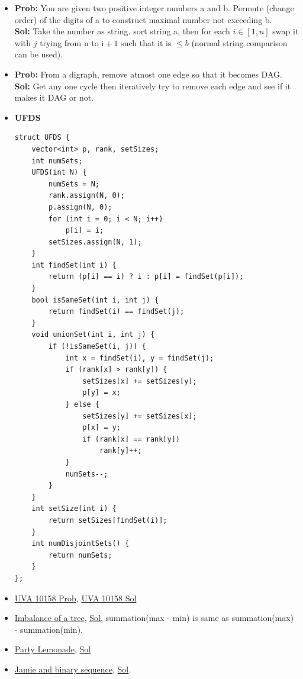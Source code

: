 \documentclass[8pt, a4paper, oneside, twocolumn]{extarticle}
\begin{document}
\begin{itemize}
    \item \textbf{Prob: }You are given two positive integer numbers a and b. Permute (change order) of the digits of a to construct maximal number not exceeding b.
    \\\textbf{Sol: }Take the number as string. sort string a, then for each $i \in [1, n]$ swap it with $j$ trying from $\text{n to i} + 1$ such that it is $\leq b$ (normal string comparison can be used).
    \item \textbf{Prob: }From a digraph, remove atmost one edge so that it becomes DAG.
    \\\textbf{Sol: }Get any one cycle then iteratively try to remove each edge and see if it makes it DAG or not.
    \item \textbf{UFDS}
    \begin{verbatim}
struct UFDS {
    vector<int> p, rank, setSizes;
    int numSets;
    UFDS(int N) {
        numSets = N;
        rank.assign(N, 0);
        p.assign(N, 0);
        for (int i = 0; i < N; i++)
            p[i] = i;
        setSizes.assign(N, 1);
    }
    int findSet(int i) {
        return (p[i] == i) ? i : p[i] = findSet(p[i]);
    }
    bool isSameSet(int i, int j) {
        return findSet(i) == findSet(j);
    }
    void unionSet(int i, int j) {
        if (!isSameSet(i, j)) {
            int x = findSet(i), y = findSet(j);
            if (rank[x] > rank[y]) {
                setSizes[x] += setSizes[y];
                p[y] = x;
            } else {
                setSizes[y] += setSizes[x];
                p[x] = y;
                if (rank[x] == rank[y])
                    rank[y]++;
            }
            numSets--;
        }
    }
    int setSize(int i) {
        return setSizes[findSet(i)];
    }
    int numDisjointSets() {
        return numSets;
    }
};
    \end{verbatim}
    \item \href {https://uva.onlinejudge.org/external/101/10158.pdf}{UVA 10158 Prob}, \href {https://gist.github.com/sourabhxyz/3a2daf2a9f77104a94d1db9af8b40b1a}{UVA 10158 Sol}
    \item \href {https://codeforces.com/contest/915/problem/F}{Imbalance of a tree}, \href {https://github.com/sourabhxyz/Competitive-Programming/blob/master/CF/ER36/F.cpp}{Sol}, summation(max - min) is same as summation(max) - summation(min).
    \item \href {https://codeforces.com/contest/913/problem/C}{Party Lemonade}, \href {https://codeforces.com/contest/913/submission/34067096}{Sol}
    \item \href {https://codeforces.com/contest/916/problem/B}{Jamie and binary sequence}, \href {https://github.com/sourabhxyz/Competitive-Programming/blob/master/CF/457D2/B.cpp}{Sol}.

\end{itemize}
\end{document}
